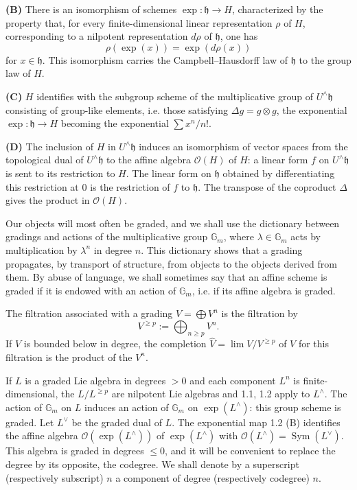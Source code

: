 \documentclass[10pt,a4paper]{article}
\newcommand{\Gm}{\mathbb G_m}
\newcommand{\Sym}{\operatorname{Sym}}
\newcommand{\OO}{\mathcal O}
\newcommand{\h}{\mathfrak h}
\newcommand{\Lhat}{L^{\wedge}}
\newcommand{\Uhat}{U^{\wedge}}
\theoremstyle{deligne}
\newcommand{\heading}[1]{\vspace{0.65em}\noindent{\bfseries #1}\quad}
\begin{document}
\textbf{(B)} There is an isomorphism of schemes \(\exp:\h\to H\), characterized by the property that, for every finite-dimensional linear representation \(\rho\) of \(H\), corresponding to a nilpotent representation \(d\rho\) of \(\h\), one has
\[
\rho(\exp(x))=\exp(d\rho(x))
\]
for \(x\in\h\). This isomorphism carries the Campbell--Hausdorff law of \(\h\) to the group law of \(H\).

\textbf{(C)} \(H\) identifies with the subgroup scheme of the multiplicative group of \(\Uhat\h\) consisting of group-like elements, i.e. those satisfying \(\Delta g=g\otimes g\), the exponential \(\exp:\h\to H\) becoming the exponential \(\sum x^n/n!\).

\textbf{(D)} The inclusion of \(H\) in \(\Uhat\h\) induces an isomorphism of vector spaces from the topological dual of \(\Uhat\h\) to the affine algebra \(\OO(H)\) of \(H\): a linear form \(f\) on \(\Uhat\h\) is sent to its restriction to \(H\). The linear form on \(\h\) obtained by differentiating this restriction at \(0\) is the restriction of \(f\) to \(\h\). The transpose of the coproduct \(\Delta\) gives the product in \(\OO(H)\).

\heading{1.3.} Our objects will most often be graded, and we shall use the dictionary between gradings and actions of the multiplicative group \(\Gm\), where \(\lambda\in\Gm\) acts by multiplication by \(\lambda^n\) in degree \(n\). This dictionary shows that a grading propagates, by transport of structure, from objects to the objects derived from them. By abuse of language, we shall sometimes say that an affine scheme is graded if it is endowed with an action of \(\Gm\), i.e. if its affine algebra is graded.

The filtration associated with a grading \(V=\bigoplus V^n\) is the filtration by
\[
V^{\ge p}:=\bigoplus_{n\ge p}V^n.
\]
If \(V\) is bounded below in degree, the completion \(\widehat V=\lim V/V^{\ge p}\) of \(V\) for this filtration is the product of the \(V^n\).

If \(L\) is a graded Lie algebra in degrees \(>0\) and each component \(L^n\) is finite-dimensional, the \(L/L^{\ge p}\) are nilpotent Lie algebras and 1.1, 1.2 apply to \(\Lhat\). The action of \(\Gm\) on \(L\) induces an action of \(\Gm\) on \(\exp(\Lhat)\): this group scheme is graded. Let \(L^\vee\) be the graded dual of \(L\). The exponential map 1.2 (B) identifies the affine algebra \(\OO(\exp(\Lhat))\) of \(\exp(\Lhat)\) with \(\OO(\Lhat)=\Sym(L^\vee)\). This algebra is graded in degrees \(\le0\), and it will be convenient to replace the degree by its opposite, the codegree. We shall denote by a superscript (respectively subscript) \(n\) a component of degree (respectively codegree) \(n\).
\end{document}
